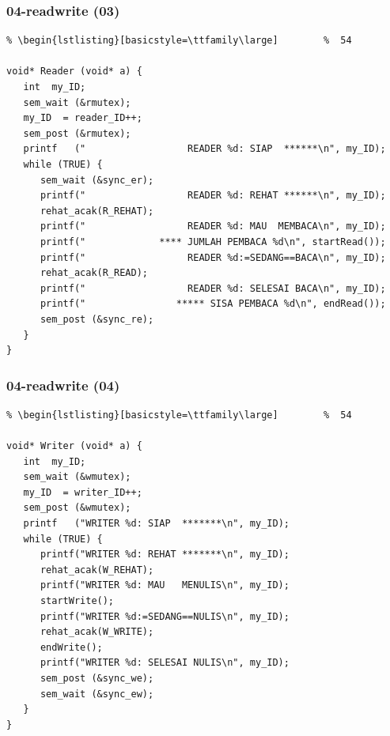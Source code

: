 \documentclass[aspectratio=169, xcolor=table, notheorems, hyperref={pdfpagelabels=false}]{beamer}
\begin{document}
\begin{frame}[fragile]
\frametitle{04-readwrite (03)}
\begin{lstlisting}[basicstyle=\ttfamily\footnotesize] %  72
% \begin{lstlisting}[basicstyle=\ttfamily\small]        %  65
% \begin{lstlisting}[basicstyle=\ttfamily\large]        %  54

void* Reader (void* a) {
   int  my_ID;
   sem_wait (&rmutex);
   my_ID  = reader_ID++;
   sem_post (&rmutex);
   printf   ("                  READER %d: SIAP  ******\n", my_ID);
   while (TRUE) {
      sem_wait (&sync_er);
      printf("                  READER %d: REHAT ******\n", my_ID);
      rehat_acak(R_REHAT);
      printf("                  READER %d: MAU  MEMBACA\n", my_ID);
      printf("             **** JUMLAH PEMBACA %d\n", startRead());
      printf("                  READER %d:=SEDANG==BACA\n", my_ID);
      rehat_acak(R_READ);
      printf("                  READER %d: SELESAI BACA\n", my_ID);
      printf("                ***** SISA PEMBACA %d\n", endRead());
      sem_post (&sync_re);
   }
}

\end{lstlisting}
\end{frame}

\begin{frame}[fragile]
\frametitle{04-readwrite (04)}
\begin{lstlisting}[basicstyle=\ttfamily\footnotesize] %  72
% \begin{lstlisting}[basicstyle=\ttfamily\small]        %  65
% \begin{lstlisting}[basicstyle=\ttfamily\large]        %  54

void* Writer (void* a) {
   int  my_ID;
   sem_wait (&wmutex);
   my_ID  = writer_ID++;
   sem_post (&wmutex);
   printf   ("WRITER %d: SIAP  *******\n", my_ID);
   while (TRUE) {
      printf("WRITER %d: REHAT *******\n", my_ID);
      rehat_acak(W_REHAT);
      printf("WRITER %d: MAU   MENULIS\n", my_ID);
      startWrite();
      printf("WRITER %d:=SEDANG==NULIS\n", my_ID);
      rehat_acak(W_WRITE);
      endWrite();
      printf("WRITER %d: SELESAI NULIS\n", my_ID);
      sem_post (&sync_we);
      sem_wait (&sync_ew);
   }
}

\end{lstlisting}
\end{frame}
\end{document}

